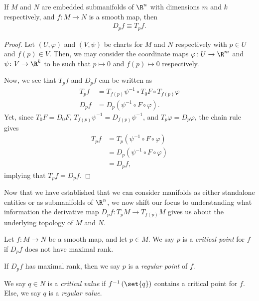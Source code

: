 \documentclass[10pt]{mypackage}
\begin{document}
\begin{proposition}
  If $M$ and $N$ are embedded submanifolds of $\R^{n}$ with dimensions $m$ and $k$ respectively, and $f\colon M\rightarrow N$ is a smooth map, then
  \begin{align*}
    D_pf \equiv T_pf.
  \end{align*}
\end{proposition}
\begin{proof}
  Let $\left( U,\varphi \right)$ and $\left( V,\psi \right)$ be charts for $M$ and $N$ respectively with $p\in U$ and $f(p)\in V$. Then, we may consider the coordinate maps $\varphi\colon U\rightarrow \R^{m}$ and $\psi\colon V\rightarrow \R^{k}$ to be such that $p\mapsto 0$ and $f(p)\mapsto 0$ respectively.\newline

  Now, we see that $T_pf$ and $D_pf$ can be written as
  \begin{align*}
    T_pf &= T_{f(p)}\psi^{-1}\circ T_0F\circ T_{f(p)}\varphi\\
    D_pf &= D_{p}\left( \psi^{-1} \circ F \circ \varphi \right).
  \end{align*}
  Yet, since $T_0F = D_0F$, $T_{f(p)}\psi^{-1} = D_{f(p)}\psi^{-1}$, and $T_p\varphi = D_p\varphi$, the chain rule gives
  \begin{align*}
    T_pf &= T_p\left( \psi^{-1}\circ F\circ \varphi \right)\\
    &= D_{p}\left( \psi^{-1}\circ F \circ \varphi \right)\\
    &= D_pf,
  \end{align*}
  implying that $T_pf = D_pf$.
\end{proof}
Now that we have established that we can consider manifolds as either standalone entities or as submanifolds of $\R^{n}$, we now shift our focus to understanding what information the derivative map $D_pf\colon T_pM\rightarrow T_{f(p)}M$ gives us about the underlying topology of $M$ and $N$.
\begin{definition}
  Let $f\colon M\rightarrow N$ be a smooth map, and let $p\in M$. We say $p$ is a \textit{critical point} for $f$ if $D_pf$ does not have maximal rank.\newline

  If $D_pf$ has maximal rank, then we say $p$ is a \textit{regular point} of $f$.\newline

  We say $q\in N$ is a \textit{critical value} if $f^{-1}\left( \set{q} \right)$ contains a critical point for $f$. Else, we say $q$ is a \textit{regular value}.
\end{definition}
\end{document}
